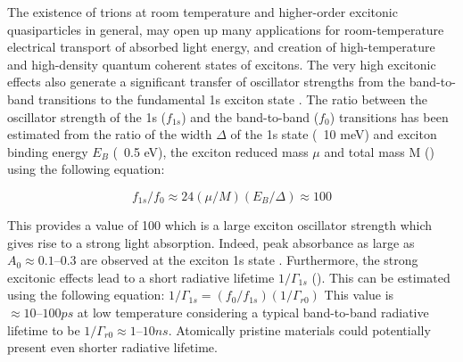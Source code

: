 The existence of trions at room temperature and higher-order excitonic quasiparticles  in general, may open up many applications for room-temperature electrical transport of absorbed light energy, and creation of high-temperature and high-density quantum coherent states of excitons.
The very high excitonic effects also generate a significant transfer of oscillator strengths from the band-to-band transitions to the fundamental 1s exciton state \cite{Haug1994}. The ratio between the oscillator strength of the 1s ($f_{1s}$) and the band-to-band ($f_0$) transitions has been estimated  from the ratio of the width $\Delta$ of the 1s state (~10 meV) and exciton binding energy $E_B$ (~0.5 eV), the exciton reduced mass $\mu$ and total mass M (\cite{Feldmann1988}\cite{Haug1989}) using the following equation:

\begin{equation}
f_{1s}/f_0 \approx 24({\mu}/M)(E_B/{\Delta}) \approx 100
\end{equation} 
 
This provides a value of 100 which is a large exciton oscillator strength which gives rise to a strong light absorption. Indeed, peak absorbance as large as $A_0 \approx 0.1–0.3$ are observed at the exciton 1s state \cite{AtomicallyThinMoS2ANewDirect-GapSemiconductor}\cite{Mak2012}. Furthermore, the strong excitonic effects lead to a  short radiative lifetime $1/{\Gamma}_{1s}$ (\cite{Feldmann1988}\cite{Haug1989}). This can be estimated using the following equation: $1/{\Gamma}_{1s} = (f_0/f_{1s})(1/{\Gamma}_{r0})$
This value is $\approx 10–100 ps$ at low temperature considering a typical band-to-band radiative lifetime to be $1/{\Gamma}_{r0} \approx 1–10 ns$. Atomically pristine materials could potentially present even shorter radiative lifetime. 


